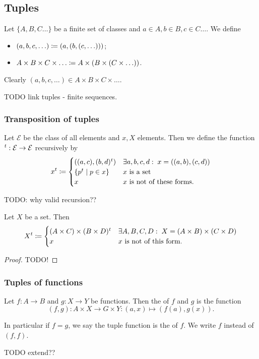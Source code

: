 \subsection{Tuples}
\begin{definition}
Let $\{A,B,C \ldots \}$ be a finite set of classes and $a\in A, b\in B, c\in C \ldots$. We define
\begin{itemize}
\item $(a,b,c,\ldots) \coloneqq (a, (b,(c,\ldots)))$;
\item $A\times B\times C\times\ldots \coloneqq A\times(B\times (C\times \ldots))$.
\end{itemize}
\end{definition}
Clearly $(a,b,c,\ldots)\in A\times B\times C\times\ldots$.

TODO link tuples - finite sequences.

\subsubsection{Transposition of tuples}
\begin{definition}
Let $\mathcal{E}$ be the class of all elements and $x,X$ elements. Then we define the function $^t: \mathcal{E}\to \mathcal{E}$ recursively by
\[ x^t \coloneqq \begin{cases}
((a,c), (b,d)^t) & \exists a,b,c,d:\; x = ((a,b), (c,d)) \\
\left\{ p^t \;\middle|\; p\in x \right\} & \text{$x$ is a set} \\
x & \text{$x$ is not of these forms.}
\end{cases} \]
\end{definition}
TODO: why valid recursion??
\begin{lemma}
Let $X$ be a set. Then
\[ X^t \coloneqq \begin{cases}
(A\times C) \times (B\times D)^t & \exists A,B,C,D:\; X = (A\times B)\times (C\times D) \\
x & \text{$x$ is not of this form.}
\end{cases} \]
\end{lemma}
\begin{proof}
TODO!
\end{proof}

\subsubsection{Tuples of functions}
\begin{definition}
Let $f: A\to B$ and $g: X\to Y$ be functions. Then the  of $f$ and $g$ is the function
\[ (f,g): A\times X \to G\times Y: (a,x) \mapsto (f(a), g(x)). \]

In particular if $f=g$, we say the tuple function is the  of $f$. We write $f$ instead of $(f,f)$.
\end{definition}

TODO extend??